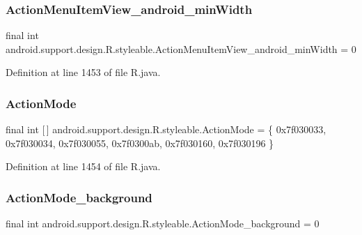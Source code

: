 \subsubsection{\texorpdfstring{ActionMenuItemView\_android\_minWidth}{ActionMenuItemView\_android\_minWidth}}
{\footnotesize\ttfamily final int android.\+support.\+design.\+R.\+styleable.\+Action\+Menu\+Item\+View\+\_\+android\+\_\+min\+Width = 0\hspace{0.3cm}{\ttfamily [static]}}



Definition at line 1453 of file R.\+java.

\mbox{\label{classandroid_1_1support_1_1design_1_1_r_1_1styleable_aece7cc3345738baf4a59955f870e1507}} 
\subsubsection{\texorpdfstring{ActionMode}{ActionMode}}
{\footnotesize\ttfamily final int \mbox{[}$\,$\mbox{]} android.\+support.\+design.\+R.\+styleable.\+Action\+Mode = \{ 0x7f030033, 0x7f030034, 0x7f030055, 0x7f0300ab, 0x7f030160, 0x7f030196 \}\hspace{0.3cm}{\ttfamily [static]}}



Definition at line 1454 of file R.\+java.

\mbox{\label{classandroid_1_1support_1_1design_1_1_r_1_1styleable_a2fcf62896806a253284078a92c738931}} 
\subsubsection{\texorpdfstring{ActionMode\_background}{ActionMode\_background}}
{\footnotesize\ttfamily final int android.\+support.\+design.\+R.\+styleable.\+Action\+Mode\+\_\+background = 0\hspace{0.3cm}{\ttfamily [static]}}



